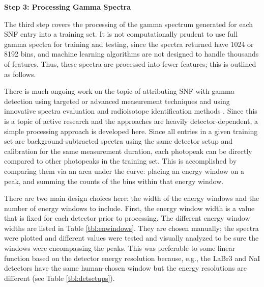 \noindent \textbf{Step 3: Processing Gamma Spectra}

The third step covers the processing of the gamma spectrum generated for each
\gls{SNF} entry into a training set.  It is not computationally prudent to use
full gamma spectra for training and testing, since the spectra returned have
1024 or 8192 bins, and machine learning algorithms are not designed to handle
thousands of features.  Thus, these spectra are processed into fewer features; 
this is outlined as follows.

There is much ongoing work on the topic of attributing \gls{SNF} with gamma
detection using targeted or advanced measurement techniques \cite{snf_gamma,
compton_supp, bwr_high-res_gamma, pwr_bwr_gamma} and using innovative spectra
evaluation and radioisotope identification methods \cite{riid_09,
rapid_riid_18, sull_gen_07, sull_valid_15, sull_auto_17, sull_unc_17}.  Since
this is a topic of active research and the approaches are heavily
detector-dependent, a simple processing approach is developed here.  Since all
entries in a given training set are background-subtracted spectra using the
same detector setup and calibration for the same measurement duration, each
photopeak can be directly compared to other photopeaks in the training set.
This is accomplished by comparing them via an area under the curve: placing an
energy window on a peak, and summing the counts of the bins within that energy
window. 

There are two main design choices here: the width of the energy windows and the
number of energy windows to include. First, the energy window width is a value
that is fixed for each detector prior to processing.  The different energy
window widths are listed in Table \ref{tbl:enwindows}.  They are chosen
manually; the spectra were plotted and different values were tested and
visually analyzed to be sure the windows were encompassing the peaks. This was
preferable to some linear function based on the detector energy resolution
because, e.g., the \gls{LaBr3} and \gls{NaI} detectors have the same
human-chosen window but the energy resolutions are different (see Table
\ref{tbl:detsetups}). 

